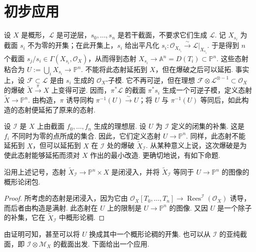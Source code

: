 \section{初步应用}\label{sec:ag-2-3}
\begin{numpara}[有理映射的延拓 1]\label{item:ag-2-3-1}
设 $X$ 是概形，$\mathcal L$ 是可逆层，$s_0,\ldots,s_n$ 是若干截面，不要求它们生成 $\mathcal L$. 记 $X_{s_i}$ 为截面 $s_i$ 不为零的开集；在此开集上，$s_i$ 给出平凡化 $s_i:\mathcal O_{X_{s_i}}\xrightarrow\sim\mathcal L|_{X_{s_i}}$. 于是得到 $n$ 个截面 $s_j/s_i\in\Gamma(X_{s_i},\mathcal O_X)$，从而得到态射 $X_{s_i}\longrightarrow\mathbb A^n=D(T_i)\subset\mathbb P^n$. 这些态射粘合为 $U:=\bigcup_iX_{s_i}\longrightarrow\mathbb P^n$.
不能将此态射延拓到 $X$，但在爆破之后可以延拓. 事实上，设 $\mathcal F\subset\mathcal L$ 是由 $s_i$ 生成的 $\mathcal O_X$-子模. 它不再可逆，但在理想 $\mathcal F\otimes\mathcal L^{\otimes-1}\subset\mathcal O_X$ 的爆破 $\widetilde X\xrightarrow\pi X$ 上变得可逆. 因而，$\pi^*\mathcal L$ 的截面 $\pi^*s_i$ 生成一个可逆子模，定义态射 $\widetilde X\longrightarrow\mathbb P^n$. 由构造，$\pi$ 诱导同构 $\pi^{-1}(U)\xrightarrow\sim U$；将 $U$ 与 $\pi^{-1}(U)$ 等同后，如此构造的态射便延拓了原来的态射.
\end{numpara}
\begin{numpara}[有理映射的延拓 2]\label{item:ag-2-3-2}
设 $\mathcal I$ 是 $X$ 上由截面 $f_0,\ldots,f_n$ 生成的理想层. 设 $U$ 为 $\mathcal I$ 定义的闭集的补集. 这是 $f_i$ 不同时为零的点所成的集合. 因此，它们定义态射 $U\longrightarrow\mathbb P^n$. 同样，此态射不能延拓到 $X$，但可以延拓到 $X$ 在 $\mathcal I$ 处的爆破 $\widetilde X_{\mathcal I}$. 从某种意义上说，这次爆破是为使此态射能够延拓而须对 $X$ 作出的最小改造. 更确切地说，有如下命题.
\end{numpara}
\begin{proposition*}
沿用上述记号，态射 $\widetilde X_{\mathcal I}\longrightarrow\mathbb P^n\times X$ 是闭浸入，并将 $\widetilde X_{\mathcal I}$ 等同于 $U\longrightarrow\mathbb P^n$ 的图像的概形论闭包.
\end{proposition*}
\begin{proof}
所考虑的态射是闭浸入，因为它由 $\mathcal O_X[T_0,\ldots,T_n]\longrightarrow\operatorname{Rees}^{\mathcal I}(\mathcal O_X)$ 诱导，而后者由构造是满射. 此态射在 $U$ 上的限制是 $U\longrightarrow\mathbb P^n$ 的图像. 又因 $U$ 是一个除子的补集，它在 $\widetilde X_{\mathcal I}$ 中概形论稠.
\end{proof}
由证明可知，甚至可以将 $U$ 换成其中一个概形论稠的开集. 也可以从 $\mathcal I$ 的亚纯截面，即 $\mathcal I\otimes\mathcal M_X$ 的截面出发. 下面给出一个应用.
